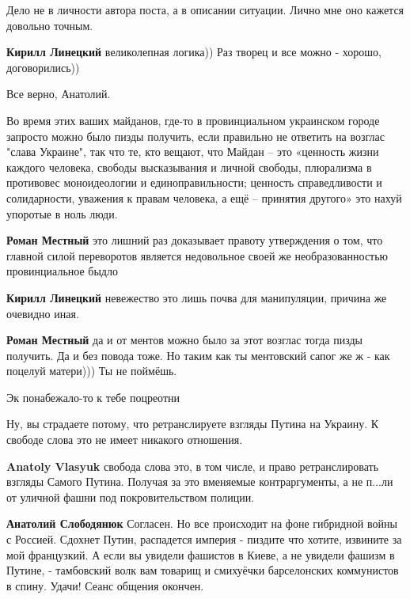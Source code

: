 \begin{itemize}
\begin{itemize}
Дело не в личности автора поста, а в описании ситуации. Лично мне оно кажется довольно точным.

\textbf{Кирилл Линецкий} великолепная логика)) Раз творец и все можно - хорошо, договорились))

\end{itemize} %

Все верно, Анатолий.


Во время этих ваших майданов, где-то в провинциальном украинском городе
запросто можно было пизды получить, если правильно не ответить на возглас
"слава Украине", так что те, кто вещают, что Майдан – это «ценность жизни
каждого человека, свободы высказывания и личной свободы, плюрализма в
противовес моноидеологии и единоправильности; ценность справедливости и
солидарности, уважения к правам человека, а ещё – принятия другого» это нахуй
упоротые в ноль люди.

\begin{itemize} %
\textbf{Роман Местный} это лишний раз доказывает правоту утверждения о том, что главной силой переворотов является недовольное своей же необразованностью провинциальное быдло

\textbf{Кирилл Линецкий} невежество это лишь почва для манипуляции, причина же очевидно иная.

\textbf{Роман Местный} да и от ментов можно было за этот возглас тогда пизды получить. Да и без повода тоже. Но таким как ты ментовский сапог же ж - как поцелуй матери))) Ты не поймёшь.
\end{itemize} %

Эк понабежало-то к тебе поцреотни

Ну, вы страдаете потому, что ретранслируете взгляды Путина на Украину. К свободе слова это не имеет никакого отношения.

\begin{itemize} %
\textbf{Anatoly Vlasyuk} свобода слова это, в том числе, и право ретранслировать взгляды Самого Путина. Получая за это вменяемые контраргументы, а не п...ли от уличной фашни под покровительством полиции.

\textbf{Анатолий Слободянюк} Согласен. Но все происходит на фоне гибридной войны с Россией. Сдохнет Путин, распадется империя - пиздите что хотите, извините за мой французкий. А если вы увидели фашистов в Киеве, а не увидели фашизм в Путине, - тамбовский волк вам товарищ и смихуёчки барселонских коммунистов в спину. Удачи! Сеанс общения окончен.


\end{itemize}
\end{itemize}
